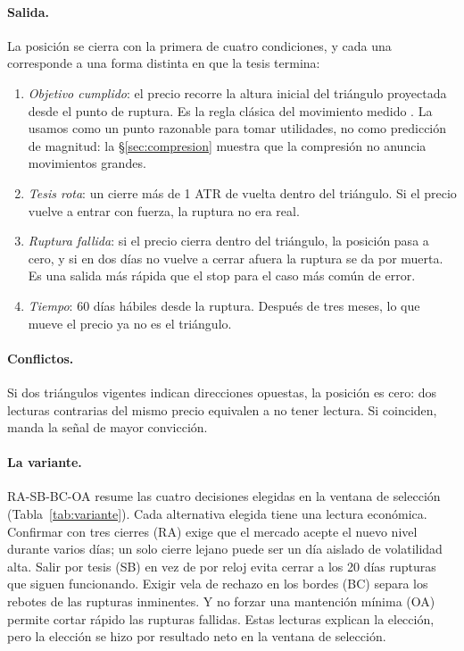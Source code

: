 \documentclass[10pt,a4paper]{article}
\begin{document}
\paragraph{Salida.} La posición se cierra con la primera de cuatro condiciones,
y cada una corresponde a una forma distinta en que la tesis termina:
\begin{enumerate}[label=(\roman*)]
  \item \emph{Objetivo cumplido}: el precio recorre la altura inicial del
        triángulo proyectada desde el punto de ruptura. Es la regla clásica del
        movimiento medido \citep{edwards2018}. La usamos como un punto razonable para
        tomar utilidades, no como predicción de magnitud: la
        §\ref{sec:compresion} muestra que la compresión no anuncia movimientos
        grandes.
  \item \emph{Tesis rota}: un cierre más de 1 ATR de vuelta dentro del triángulo.
        Si el precio vuelve a entrar con fuerza, la ruptura no era real.
  \item \emph{Ruptura fallida}: si el precio cierra dentro del triángulo, la
        posición pasa a cero, y si en dos días no vuelve a cerrar afuera la
        ruptura se da por muerta. Es una salida más rápida que el stop para el
        caso más común de error.
  \item \emph{Tiempo}: 60 días hábiles desde la ruptura. Después de tres meses, lo
        que mueve el precio ya no es el triángulo.
\end{enumerate}

\paragraph{Conflictos.} Si dos triángulos vigentes indican direcciones opuestas,
la posición es cero: dos lecturas contrarias del mismo precio equivalen a no tener
lectura. Si coinciden, manda la señal de mayor convicción.

\paragraph{La variante.} RA-SB-BC-OA resume las cuatro decisiones elegidas en la
ventana de selección (Tabla~\ref{tab:variante}). Cada alternativa elegida tiene una
lectura económica. Confirmar con tres cierres (RA) exige que el mercado acepte el
nuevo nivel durante varios días; un solo cierre lejano puede ser un día aislado de
volatilidad alta. Salir por tesis (SB) en vez de por reloj evita cerrar a los 20
días rupturas que siguen funcionando. Exigir vela de rechazo en los bordes (BC)
separa los rebotes de las rupturas inminentes. Y no forzar una mantención mínima
(OA) permite cortar rápido las rupturas fallidas. Estas lecturas explican la
elección, pero la elección se hizo por resultado neto en la ventana de
selección.
\end{document}
